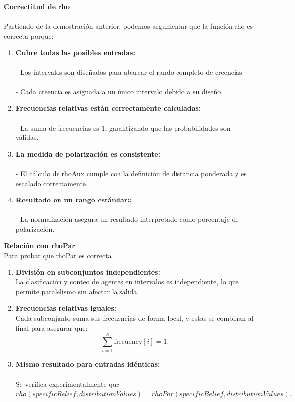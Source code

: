 \documentclass{article}
\begin{document}
  
    \textbf{Correctitud de rho}\\\\
    Partiendo de la demostración anterior, podemos argumentar que la función rho es correcta porque:
    \begin{enumerate}
      \item \textbf{Cubre todas las posibles entradas:}\\\\
      -  Los intervalos son diseñados para abarcar el rando completo de creencias.\\\\
      -  Cada creencia es asignada a un único intervalo debido a su diseño.
      \item \textbf{Frecuencias relativas están correctamente calculadas:}\\\\
      -  La suma de frecuencias es 1, garantizando que las probabilidades son válidas.
      \item \textbf{La medida de polarización es consistente:}\\\\
      -  El cálculo de rhoAux cumple con la definición de distancia ponderada y es escalado correctamente.
      \item \textbf{Resultado en un rango estándar::}\\\\
      -  La normalización asegura un resultado interpretado como porcentaje de polarización.
    \end{enumerate}
      
    \textbf{Relación con rhoPar}\\
    
    Para probar que rhoPar es correcta
  
      \begin{enumerate}
      \item \textbf{División en subconjuntos independientes:}\\
      La clasificación y conteo de agentes en intervalos es independiente, lo que permite paralelismo sin afectar la salida.
      \item \textbf{Frecuencias relativas iguales:}\\
      Cada subconjunto suma sus frecuencias de forma local, y estas se combinan al final para asegurar que:
        \[
        \sum_{i=1}^{k} \text{frecuency}[i] = 1.
        \]  
      \item \textbf{Mismo resultado para entradas idénticas:}\\\\
      Se verifica experimentalmente que $rho(specificBelief,distributionValues)=rhoPar(specificBelief,distributionValues).$
    \end{enumerate}
    
\end{document}
